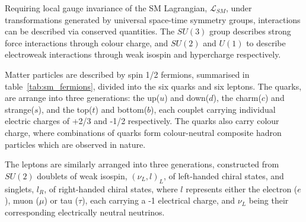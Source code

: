Requiring local gauge invariance of the SM Lagrangian, $\mathcal{L}_{SM}$,
under
transformations generated by universal space-time symmetry groups,
interactions can be described via conserved quantities. The $SU(3)$ group
describes strong force interactions through colour charge, and $SU(2)$ and $U(1)$ to
describe electroweak interactions through weak isospin and hypercharge respectively.


Matter particles are described by spin 1/2 fermions, summarised in
table~\ref{tab:sm_fermions}, divided into the six quarks
and six leptons. The quarks, are arrange into three generations: the up($u$) and
down($d$), the charm($c$) and strange($s$), and the top($t$) and bottom($b$),
each couplet carrying
individual electric charges of +2/3 and -1/2 respectively. The quarks also carry
colour charge, where combinations of quarks form colour-neutral composite
hadron particles which are observed in nature.


The leptons are similarly arranged into three generations, constructed from
$SU(2)$
doublets of weak isospin, $(\nu_L, l)_L$, of left-handed chiral states, and
singlets, $l_R$, of right-handed chiral states, where $l$ represents either the
electron ($e$), muon ($\mu$) or tau ($\tau$), each carrying a -1 electrical
charge, and $\nu_L$ being their corresponding electrically neutral neutrinos.


